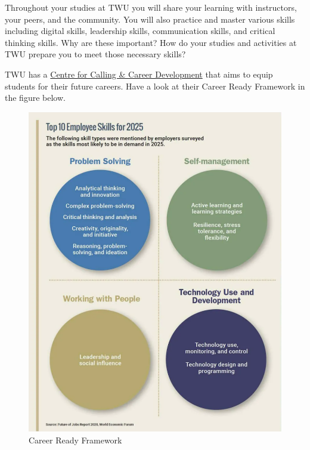 \documentclass[
  letterpaper,
  DIV=11,
  numbers=noendperiod]{scrreprt}
\begin{document}
\begin{tcolorbox}[enhanced jigsaw, toprule=.15mm, colback=white, colframe=quarto-callout-note-color-frame, bottomtitle=1mm, leftrule=.75mm, coltitle=black, titlerule=0mm, rightrule=.15mm, colbacktitle=quarto-callout-note-color!10!white, left=2mm, title={Learning Activity}, opacitybacktitle=0.6, opacityback=0, breakable, toptitle=1mm, arc=.35mm, bottomrule=.15mm]

Throughout your studies at TWU you will share your learning with
instructors, your peers, and the community. You will also practice and
master various skills including digital skills, leadership skills,
communication skills, and critical thinking skills. Why are these
important? How do your studies and activities at TWU prepare you to meet
those necessary skills?

TWU has a
\href{https://www.twu.ca/academics/academic-professional-support/centre-calling-career-development}{Centre
for Calling \& Career Development} that aims to equip students for their
future careers. Have a look at their Career Ready Framework in the
figure below.

\begin{figure}[H]

\caption{\label{fig-TopxEmployeexSkillsx2025}Career Ready Framework}

\includegraphics{assets/u6/Top Employee Skills 2025.png}


\end{figure}
\end{tcolorbox}
\end{document}
